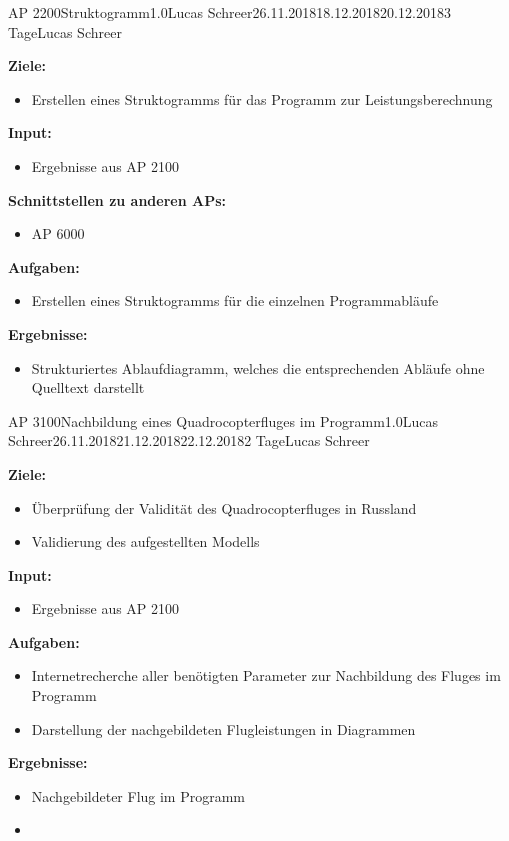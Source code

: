 \clearpage
\begin{wpd}{AP 2200}{Struktogramm}{1.0}{Lucas Schreer}{26.11.2018}{18.12.2018}{20.12.2018}{3 Tage}{Lucas Schreer}
    {
    \textbf{Ziele:}
    \begin{itemize}
        \item Erstellen eines Struktogramms für das Programm zur Leistungsberechnung
    \end{itemize}
    \textbf{Input:}
    \begin{itemize}
        \item Ergebnisse aus AP 2100
    \end{itemize}
    \textbf{Schnittstellen zu anderen APs:}
    \begin{itemize}
        \item AP 6000
    \end{itemize}
    \textbf{Aufgaben:}
    \begin{itemize}
        \item Erstellen eines Struktogramms für die einzelnen Programmabläufe
    \end{itemize}
    \textbf{Ergebnisse:}
    \begin{itemize}
        \item Strukturiertes Ablaufdiagramm, welches die entsprechenden Abläufe ohne Quelltext darstellt
    \end{itemize}
    }
\end{wpd}


\clearpage
\begin{wpd}{AP 3100}{Nachbildung eines Quadrocopterfluges im Programm}{1.0}{Lucas Schreer}{26.11.2018}{21.12.2018}{22.12.2018}{2 Tage}{Lucas Schreer}
    {
    \textbf{Ziele:}
    \begin{itemize}
        \item Überprüfung der Validität des Quadrocopterfluges in Russland
        \item Validierung des aufgestellten Modells
    \end{itemize}
    \textbf{Input:}
    \begin{itemize}
        \item Ergebnisse aus AP 2100
    \end{itemize}
    \textbf{Aufgaben:}
    \begin{itemize}
        \item Internetrecherche aller benötigten Parameter zur Nachbildung des Fluges im Programm
        \item Darstellung der nachgebildeten Flugleistungen in Diagrammen
    \end{itemize}
    \textbf{Ergebnisse:}
    \begin{itemize}
        \item Nachgebildeter Flug im Programm
        \item 
    \end{itemize}
    }
\end{wpd}

